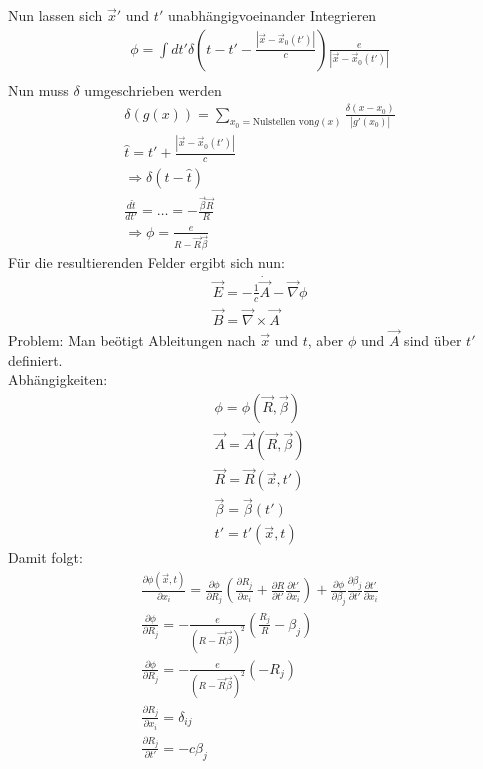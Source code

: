 \documentclass[a4paper]{article}
\begin{document}
Nun lassen sich $\vec{x}'$ und $t'$ unabhängigvoeinander Integrieren
\begin{align}
\phi=\int dt' \delta\left(t-t'-\frac{|\vec{x}-\vec{x}_0(t')|}{c}\right)
\frac{e}{|\vec{x}-\vec{x}_0(t')|}\\
\end{align}
Nun muss $\delta$ umgeschrieben werden
\begin{align}
\delta(g(x))=\sum_{x_0=\text{Nulstellen von
}g(x)}\frac{\delta(x-x_0)}{|g'(x_0)|}\\
\hat{t}=t'+\frac{|\vec{x}-\vec{x}_0(t')|}{c}\\
\Rightarrow \delta(t-\hat{t})\\
\frac{d\hat{t}}{dt'}=\ldots=-\frac{\vec{\beta}\vec{R}}{R}\\
\Rightarrow \phi=\frac{e}{R-\vec{R}\vec{\beta}}
\end{align}
Für die resultierenden Felder ergibt sich nun:
\begin{align}
\vec{E}=-\frac{1}{c}\dot{\vec{A}}-\vec{\nabla}\phi\\
\vec{B}=\vec{\nabla}\times\vec{A}
\end{align}
Problem: Man beötigt Ableitungen nach $\vec{x}$ und $t$, aber $\phi$ und
$\vec{A}$ sind über $t'$ definiert.\\
Abhängigkeiten:
\begin{align}
\phi=\phi(\vec{R},\vec{\beta})\\
\vec{A}=\vec{A}(\vec{R},\vec{\beta})\\
\vec{R}=\vec{R}(\vec{x},t')\\
\vec{\beta}=\vec{\beta}(t')\\
t'=t'(\vec{x},t)
\end{align}
Damit folgt:
\begin{align}
\frac{\partial \phi(\vec{x},t)}{\partial x_i}=\frac{\partial \phi}{\partial
R_j}\left( \frac{\partial R_j}{\partial x_i} +\frac{\partial R}{\partial
t'} \frac{\partial t'}{\partial x_i}\right)+\frac{\partial \phi}{\partial
\beta_j}\frac{\partial \beta_j}{\partial t'}\frac{\partial t'}{\partial x_i}\\
\frac{\partial \phi}{\partial
R_j}=-\frac{e}{(R-\vec{R}\vec{\beta})^2}(\frac{R_j}{R}-\beta_j)\\
\frac{\partial \phi}{\partial
R_j}=-\frac{e}{(R-\vec{R}\vec{\beta})^2}(-R_j)\\
\frac{\partial R_j}{\partial x_i}=\delta_{ij}\\
\frac{\partial R_j}{\partial t'}=-c\beta_j\\
\end{align}
\end{document}
